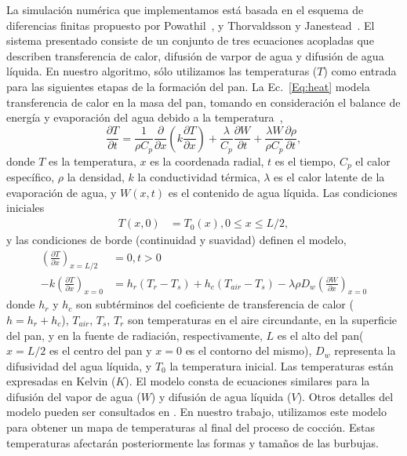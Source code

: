 La simulación numérica que implementamos está basada en el esquema de diferencias finitas propuesto por Powathil~\cite{Powathil2004}, y Thorvaldsson y Janestead~\cite{Thorvaldsson1999}. 
El sistema presentado consiste de un conjunto de tres ecuaciones acopladas que describen transferencia de calor, difusión de varpor de agua y difusión de agua líquida.
En nuestro algoritmo, sólo utilizamos las temperaturas ($T$) como entrada para las siguientes etapas de la formación del pan.
La Ec.~\ref{Eq:heat} modela transferencia de calor en la masa del pan, tomando en consideración el balance de energía y evaporación del agua debido a la temperatura~\cite{Thorvaldsson1999},
%
\begin{equation}
\label{Eq:heat}
\frac{\partial T}{\partial t} = \frac{1}{\rho C_{p}} \frac{\partial}{\partial x} \left ( k \frac{\partial T}{\partial x} \right ) + \frac{\lambda}{C_{p}} \frac{\partial W}{\partial t}+\frac{\lambda W}{ \rho C_{p} }\frac{\partial \rho}{\partial t},
\end{equation}
%
donde $T$ es la temperatura, $x$ es la coordenada radial, $t$ es el tiempo, $C_{p}$ el calor específico, $\rho$ la densidad, $k$ la conductividad térmica, $\lambda$ es el calor latente de la evaporación de agua, y $W(x,t)$ es el contenido de agua líquida. 
Las condiciones iniciales
%
\begin{align*}
T(x,0) &= T_{0}(x), 0\le x \le L/2,
\end{align*}
y las condiciones de borde (continuidad y suavidad) definen el modelo,
\begin{align*}
\left ( \frac{\partial T}{\partial x} \right )_{x=L/2} &= 0 , t > 0 \\
-k \left ( \frac{\partial T}{\partial x} \right )_{x=0} &= h_{r}(T_{r}-T_{s}) + h_{c}(T_{air}-T_{s}) - \lambda \rho D_{w} \left (\frac{\partial W}{\partial x} \right )_{x=0}
\end{align*}
%
donde $h_{r}$ y $h_{c}$ son subtérminos del coeficiente de transferencia de calor ($h = h_{r}+h_{c}$), $T_{air}$, $T_{s}$, $T_{r}$ son temperaturas en el aire circundante, en la superficie del pan, y en la fuente de radiación, respectivamente, $L$ es el alto del pan($x = L/2$ es el centro del pan y $x = 0$ es el contorno del mismo), $D_{w}$ representa la difusividad del agua líquida, y $T_{0}$ la temperatura inicial. 
Las temperaturas están expresadas en Kelvin ($K$). 
El modelo consta de ecuaciones similares para la difusión del vapor de agua ($W$) y difusión de agua líquida ($V$).
Otros detalles del modelo pueden ser consultados en \cite{Thorvaldsson1999}.
En nuestro trabajo, utilizamos este modelo para obtener un mapa de temperaturas al final del proceso de cocción.
Estas temperaturas afectarán posteriormente las formas y tamaños de las burbujas.

